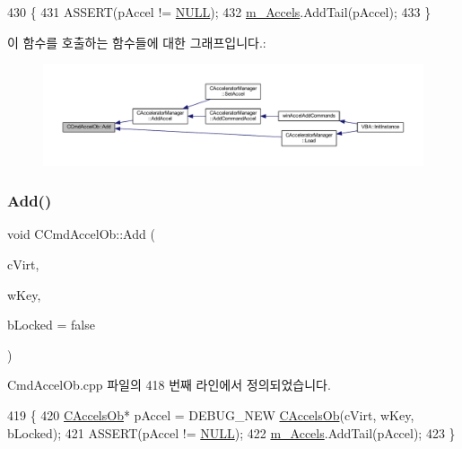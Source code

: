 \begin{DoxyCode}
430 \{
431   ASSERT(pAccel != \mbox{\hyperlink{getopt1_8c_a070d2ce7b6bb7e5c05602aa8c308d0c4}{NULL}});
432   \mbox{\hyperlink{class_c_cmd_accel_ob_a85772f1ea9204af42b8a39a0135dc0f8}{m\_Accels}}.AddTail(pAccel);
433 \}
\end{DoxyCode}
이 함수를 호출하는 함수들에 대한 그래프입니다.\+:
\nopagebreak
\begin{figure}[H]
\begin{center}
\leavevmode
\includegraphics[width=350pt]{class_c_cmd_accel_ob_a519f8c7ac935b0d06531589e5427b656_icgraph}
\end{center}
\end{figure}
\mbox{\label{class_c_cmd_accel_ob_a15429015a20179a0e181347f35ad9c58}} 
\subsubsection{\texorpdfstring{Add()}{Add()}\hspace{0.1cm}{\footnotesize\ttfamily [2/2]}}
{\footnotesize\ttfamily void C\+Cmd\+Accel\+Ob\+::\+Add (\begin{DoxyParamCaption}\item[{B\+Y\+TE}]{c\+Virt,  }\item[{W\+O\+RD}]{w\+Key,  }\item[{bool}]{b\+Locked = {\ttfamily false} }\end{DoxyParamCaption})}



Cmd\+Accel\+Ob.\+cpp 파일의 418 번째 라인에서 정의되었습니다.


\begin{DoxyCode}
419 \{
420   \mbox{\hyperlink{class_c_accels_ob}{CAccelsOb}}* pAccel = DEBUG\_NEW \mbox{\hyperlink{class_c_accels_ob}{CAccelsOb}}(cVirt, wKey, bLocked);
421   ASSERT(pAccel != \mbox{\hyperlink{getopt1_8c_a070d2ce7b6bb7e5c05602aa8c308d0c4}{NULL}});
422   \mbox{\hyperlink{class_c_cmd_accel_ob_a85772f1ea9204af42b8a39a0135dc0f8}{m\_Accels}}.AddTail(pAccel);
423 \}
\end{DoxyCode}
\mbox{\label{class_c_cmd_accel_ob_a7040471adc76f057a1d79c9fdfb84fe8}} 
